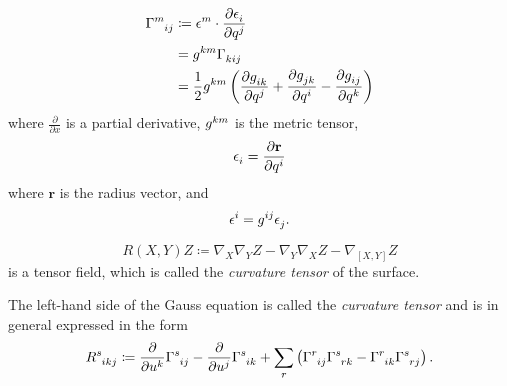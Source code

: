 \documentclass[../main.tex]{subfiles}
\begin{document}
\begin{definition}\label{ChristoffelSymbol}
    \begin{align*}
        \tensor{\Gamma}{^m_i_j}
         & \coloneqq \tensor{\epsilon}{^m}
        \cdot\frac{\partial \tensor{\epsilon}{_i}}{\partial \tensor{q}{^j}} \\
         & = \tensor{g}{^k^m}\tensor{\Gamma}{_k_i_j}                        \\
         & = \frac{1}{2}\tensor{g}{^k^m}\left(
        \frac{\partial \tensor{g}{_i_k}}{\partial \tensor{q}{^j}}
        + \frac{\partial \tensor{g}{_j_k}}{\partial \tensor{q}{^i}}
        - \frac{\partial \tensor{g}{_i_j}}{\partial \tensor{q}{^k}}
        \right)
    \end{align*}
    where \(\frac{\partial}{\partial x}\) is a partial derivative,
    \(\tensor{g}{^k^m}\) is the metric tensor,
    \begin{equation*}
        \tensor{\epsilon}{_i} = \frac{\partial \mathbf{r}}{\partial \tensor{q}{^i}}
    \end{equation*}
    where \(\mathbf{r}\) is the radius vector, and
    \begin{equation*}
        \tensor{\epsilon}{^i} = \tensor{g}{^i^j}\tensor{\epsilon}{_j} \text{.}
    \end{equation*}
\end{definition}
\begin{definition}\label{CurvatureTensor}
    \[
        R\left(X,Y\right)Z
        \coloneqq
        \nabla_X\nabla_YZ - \nabla_Y\nabla_XZ - \nabla_{\left[X,Y\right]}Z
    \]
    is a tensor field, which is called the \textit{curvature tensor} of the surface.
\end{definition}
\begin{remark}\label{CurvatureTensor_as_ChristoffelSymbol}
    The left-hand side of the Gauss equation is called the \textit{curvature tensor}
    and is in general expressed in the form
    \[
        \tensor{R}{^s_i_k_j}
        \coloneqq
        \frac{\partial}{\partial\tensor{u}{^k}}\tensor{\Gamma}{^s_i_j}
        - \frac{\partial}{\partial\tensor{u}{^j}}\tensor{\Gamma}{^s_i_k}
        + \sum_{r}\left(\tensor{\Gamma}{^r_i_j}\tensor{\Gamma}{^s_r_k}-\tensor{\Gamma}{^r_i_k}\tensor{\Gamma}{^s_r_j}\right) \text{.}
    \]
\end{remark}
\end{document}
